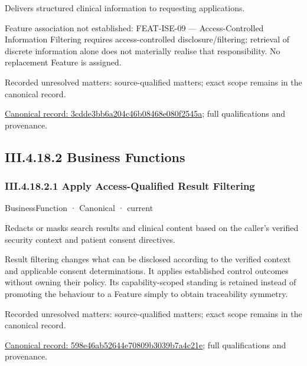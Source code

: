 Delivers structured clinical information to requesting applications.



Feature association not established: FEAT-ISE-09 — Access-Controlled Information Filtering requires access-controlled disclosure/filtering; retrieval of discrete information alone does not materially realise that responsibility. No replacement Feature is assigned.


{\small Recorded unresolved matters: source-qualified matters; exact scope remains in the canonical record.}\par
{\footnotesize \href{../../../../continuum/business/business-service/3cdde3bb6a204c46b08468e080f2545a.md}{Canonical record: 3cdde3bb6a204c46b08468e080f2545a}; full qualifications and provenance.}\par
\subsection*{III.4.18.2 Business Functions}
\label{navigation:III.4.18.2}

\subsubsection*{III.4.18.2.1 Apply Access-Qualified Result Filtering}
\label{navigation:III.4.18.2.1}

\label{element:598e46ab52644e70809b3039b7a4c21e}
{\small BusinessFunction · Canonical · current}\par

Redacts or masks search results and clinical content based on the caller's verified security context and patient consent directives.



Result filtering changes what can be disclosed according to the verified context and applicable consent determinations. It applies established control outcomes without owning their policy. Its capability-scoped standing is retained instead of promoting the behaviour to a Feature simply to obtain traceability symmetry.


{\small Recorded unresolved matters: source-qualified matters; exact scope remains in the canonical record.}\par
{\footnotesize \href{../../../../continuum/business/business-function/598e46ab52644e70809b3039b7a4c21e.md}{Canonical record: 598e46ab52644e70809b3039b7a4c21e}; full qualifications and provenance.}\par
